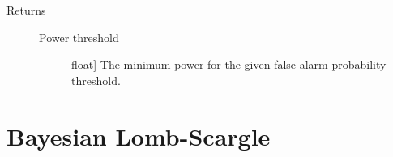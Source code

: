 \documentclass[letterpaper,10pt,english]{sphinxmanual}
\begin{document}
\begin{fulllineitems}
\begin{fulllineitems}
\begin{description}
\begin{description}
\end{description}

\item[{Returns}] \leavevmode\begin{description}
\item[{Power threshold}] \leavevmode{[}float{]}
The minimum power for the given
false-alarm probability threshold.

\end{description}

\end{description}

\end{fulllineitems}


\end{fulllineitems}



\section{Bayesian Lomb-Scargle}
\label{api:bayesian-lomb-scargle}
\end{document}
